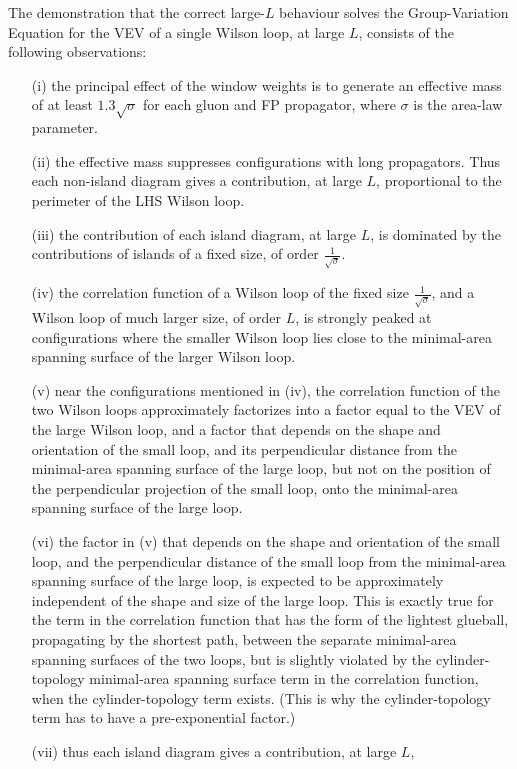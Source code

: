 \documentclass[a4paper,12pt,oneside]{article}
\begin{document}
The demonstration that the correct large-$L$ behaviour solves the
Group-Variation Equation for the VEV of a single Wilson loop, at large $L$,
consists of the following observations:
\begin{itemize}
	\item[(i)] the principal effect of the window weights is to generate an effective
mass of at least $1.3\sqrt{\sigma}$ for each gluon and FP propagator, where
$\sigma$ is the area-law parameter.
\item[(ii)] the effective mass suppresses configurations with long propagators.
Thus each non-island diagram gives a contribution, at large $L$,
proportional to the perimeter of the LHS Wilson loop.
\item[(iii)] the contribution of each island diagram, at large $L$, is dominated by
the contributions of islands of a fixed size, of order
$\frac{1}{\sqrt{\sigma}}$.
\item[(iv)] the correlation function of a Wilson loop of the fixed size
$\frac{1}{\sqrt{\sigma}}$, and a Wilson loop of much larger size, of order
$L$, is strongly peaked at configurations where the smaller Wilson loop lies
close to the minimal-area spanning surface of the larger Wilson loop.
\item[(v)] near the configurations mentioned in (iv), the correlation function of
the two Wilson loops approximately factorizes into a factor equal to the VEV
of the large Wilson loop, and a factor that depends on the shape and
orientation of the small loop, and its perpendicular distance from the
minimal-area spanning surface of the large loop, but not on the position of
the perpendicular projection of the small loop, onto the minimal-area
spanning surface of the large loop.
\item[(vi)] the factor in (v) that depends on the shape and orientation 
of the small loop, and the perpendicular distance of the small loop from
the minimal-area spanning surface of the large loop, is expected to be
approximately independent of the shape and size of the large loop.  This 
is exactly true for the term in the correlation function that has
the form of the lightest glueball, propagating by the shortest path,
between the separate minimal-area spanning surfaces of the two loops, but
is slightly violated by the cylinder-topology minimal-area spanning 
surface term in the correlation function, when the cylinder-topology 
term exists.  (This is why the cylinder-topology term has to have a 
pre-exponential factor.)
\item[(vii)] thus each island diagram gives a contribution, at large $L$,

\end{itemize}
\end{document}
